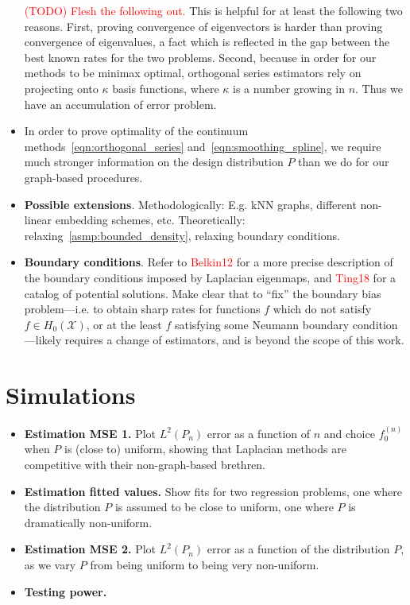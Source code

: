 \documentclass{article}
\newcommand{\1}{\mathbf{1}}
\newcommand{\Xset}{\mathcal{X}}
\theoremstyle{alden}
\theoremstyle{aldenthm}
\theoremstyle{definition}
\theoremstyle{remark}
\begin{document}
\begin{itemize}
	\textcolor{red}{(TODO) Flesh the following out.} This is helpful for at least the following two reasons. First, proving convergence of eigenvectors is harder than proving convergence of eigenvalues, a fact which is reflected in the gap between the best known rates for the two problems. Second, because in order for our methods to be minimax optimal, orthogonal series estimators rely on projecting onto $\kappa$ basis functions, where $\kappa$ is a number growing in $n$. Thus we have an accumulation of error problem.
	\item 
		 In order to prove optimality of the continuum methods~\ref{eqn:orthogonal_series} and~\ref{eqn:smoothing_spline}, we require much stronger information on the design distribution $P$ than we do for our graph-based procedures. 
	\item \textbf{Possible extensions}. Methodologically: E.g. kNN graphs, different non-linear embedding schemes, etc. Theoretically: relaxing~\ref{asmp:bounded_density}, relaxing boundary conditions.
	\item \textbf{Boundary conditions}. Refer to \textcolor{red}{Belkin12} for a more precise description of the boundary conditions imposed by Laplacian eigenmaps, and \textcolor{red}{Ting18} for a catalog of potential solutions. Make clear that to ``fix'' the boundary bias problem---i.e. to obtain sharp rates for functions $f$ which do not satisfy $f \in H_0(\Xset)$, or at the least $f$ satisfying some Neumann boundary condition---likely requires a change of estimators, and is beyond the scope of this work.
\end{itemize}

\section{Simulations}
\begin{itemize}
	\item \textbf{Estimation MSE 1.} Plot $L^2(P_n)$ error as a function of $n$ and choice $f_0^{(n)}$ when $P$ is (close to) uniform, showing that Laplacian methods are competitive with their non-graph-based brethren.
	\item \textbf{Estimation fitted values.} Show fits for two regression problems, one where the distribution $P$ is assumed to be close to uniform, one where $P$ is dramatically non-uniform.
	\item \textbf{Estimation MSE 2.} Plot $L^2(P_n)$ error as a function of the distribution $P$, as we vary $P$ from being uniform to being very non-uniform.
	 
	\item \textbf{Testing power.} 
\end{itemize}
\end{document}
